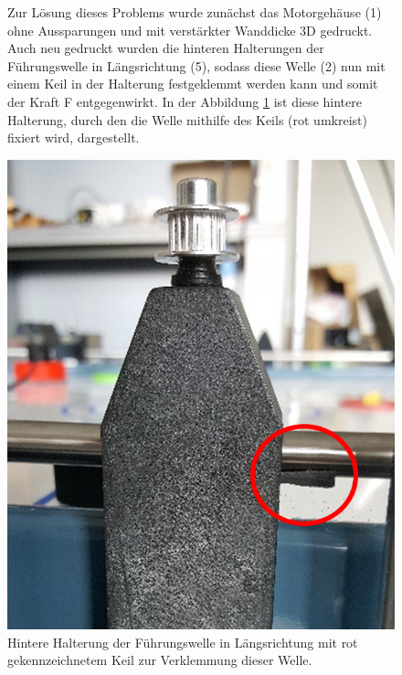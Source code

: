 \begin{figure} [h]

\begin{minipage}[t]{0.45\textwidth}
\vspace{0pt}
Zur Lösung dieses Problems wurde zunächst das Motorgehäuse (1) ohne Aussparungen und mit verstärkter Wanddicke 3D gedruckt. Auch neu gedruckt wurden die hinteren Halterungen der Führungswelle in Längsrichtung (5), sodass diese Welle (2) nun mit einem Keil in der Halterung festgeklemmt werden kann und somit der Kraft F entgegenwirkt. In der Abbildung \ref{HW_HKeil} ist diese hintere Halterung, durch den die Welle mithilfe des Keils (rot umkreist) fixiert wird, dargestellt.
\end{minipage}
\hspace{0.1\textwidth}
\begin{minipage}[t]{0.4\textwidth}
\vspace{0pt}
\includegraphics[width=\textwidth]{images/HW_Hintere_Halterung_Keil}
 \caption{Hintere Halterung der Führungswelle in Längsrichtung mit rot gekennzeichnetem Keil zur Verklemmung dieser Welle.}
 \label{HW_HKeil}
\end{minipage}
\end{figure}


